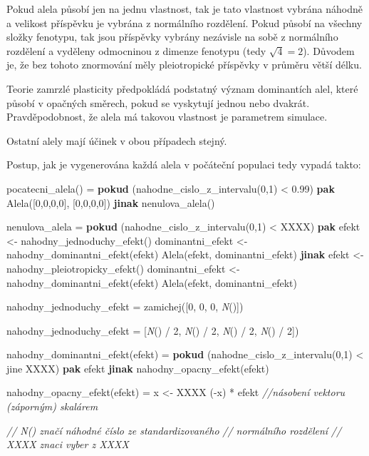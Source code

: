 Pokud alela působí jen na jednu vlastnost, tak je tato vlastnost vybrána náhodně a velikost příspěvku je vybrána z
normálního rozdělení. Pokud působí na všechny složky fenotypu, tak jsou příspěvky vybrány nezávisle na sobě z normálního
rozdělení a vyděleny odmocninou z dimenze fenotypu (tedy $\sqrt{4} = 2$). Důvodem je, že bez tohoto znormování měly
pleiotropické příspěvky v průměru větší délku.

Teorie zamrzlé plasticity předpokládá podstatný význam dominantích alel, které působí v opačných směrech, pokud se
vyskytují jednou nebo dvakrát. Pravděpodobnost, že alela má takovou vlastnost je parametrem simulace.

Ostatní alely mají účinek v obou případech stejný.


Postup, jak je vygenerována každá alela v počáteční populaci tedy vypadá takto:

\begin{code}[commandchars=\\\{\}]

    pocatecni_alela() =
        \textbf{pokud} (nahodne_cislo_z_intervalu(0,1) < 0.99)
            \textbf{pak} Alela([0,0,0,0], [0,0,0,0])
            \textbf{jinak} nenulova_alela()

    nenulova_alela =
        \textbf{pokud} (nahodne_cislo_z_intervalu(0,1) < XXXX)
            \textbf{pak}
                efekt <- nahodny_jednoduchy_efekt()
                dominantni_efekt <- nahodny_dominantni_efekt(efekt)
                Alela(efekt, dominantni_efekt)
            \textbf{jinak}
                efekt <- nahodny_pleiotropicky_efekt()
                dominantni_efekt <- nahodny_dominantni_efekt(efekt)
                Alela(efekt, dominantni_efekt)

    nahodny_jednoduchy_efekt =
        zamichej([0, 0, 0, \textit{N}()])

    nahodny_jednoduchy_efekt =
        [\textit{N}() / 2, \textit{N}() / 2, \textit{N}() / 2, \textit{N}() / 2])

    nahodny_dominantni_efekt(efekt) =
        \textbf{pokud} (nahodne_cislo_z_intervalu(0,1) < jine XXXX)
            \textbf{pak} efekt
            \textbf{jinak} nahodny_opacny_efekt(efekt)

    nahodny_opacny_efekt(efekt) =
        x <- XXXX
        (-x) * efekt \textit{//násobení vektoru (záporným) skalárem}

    \textit{// {N}() značí náhodné číslo ze standardizovaného}
    \textit{//       normálního rozdělení}
    \textit{// XXXX znaci vyber z XXXX}
\end{code}

